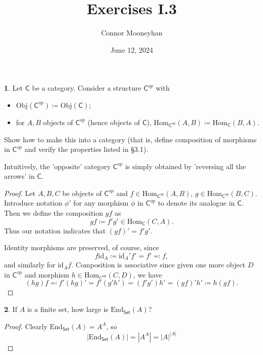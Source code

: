 \documentclass{article}
\title{Exercises I.3}
\author{Connor Mooneyhan}
\date{June 12, 2024}
\newcounter{section-number}
\theoremstyle{definition}
\newtheorem{ex}{}[section-number]
\begin{document}
\maketitle

\begin{ex}
	Let $\mathsf{C}$ be a category.
	Consider a structure $\mathsf{C}^{op}$ with \begin{itemize}
		\item $\mathrm{Obj}(\mathsf{C}^{op}) \coloneq \mathrm{Obj}(\mathsf{C})$;
		\item for $A, B$ objects of $\mathsf{C}^{op}$ (hence objects of $\mathsf{C}$), $\mathrm{Hom}_{\mathsf{C}^{op}}(A, B) \coloneq \mathrm{Hom}_{\mathsf{C}}(B, A)$.
	\end{itemize}
	Show how to make this into a category (that is, define composition of morphisms in $\mathsf{C}^{op}$ and verify the properties listed in \S 3.1).

	Intuitively, the 'opposite' category $\mathsf{C}^{op}$ is simply obtained by 'reversing all the arrows' in $\mathsf{C}$.
\end{ex}
\begin{proof}
	Let $A, B, C$ be objects of $\mathsf{C}^{op}$ and $f \in \mathrm{Hom}_{\mathsf{C}^{op}}(A, B)$, $g \in \mathrm{Hom}_{\mathsf{C}^{op}}(B, C)$.
	Introduce notation $\phi'$ for any morphism $\phi$ in $\mathsf{C}^{op}$ to denote its analogue in $\mathsf{C}$.
	Then we define the composition $gf$ as \begin{equation*}
		gf \coloneq f'g' \in \mathrm{Hom}_{\mathsf{C}}(C, A).
	\end{equation*}
	Thus our notation indicates that $(gf)' = f'g'$.

	Identity morphisms are preserved, of course, since \begin{equation*}
		f\mathrm{id}_A \coloneq \mathrm{id}_A'f' = f' \eqcolon f,
	\end{equation*}
	and similarly for $\mathrm{id}_A f$.
	Composition is associative since given one more object $D$ in $\mathsf{C}^{op}$ and morphism $h \in \mathrm{Hom}_{C^{op}}(C, D)$, we have \begin{equation*}
		(hg)f \eqcolon f'(hg)' = f'(g'h') = (f'g')h' = (gf)'h' \coloneq h(gf).
	\end{equation*}
\end{proof}

\begin{ex}
	If $A$ is a finite set, how large is $\mathrm{End}_{\mathsf{Set}}(A)$?
\end{ex}
\begin{proof}
	Clearly $\mathrm{End}_{\mathsf{Set}}(A) = A^A$, so \begin{equation*}
		|\mathrm{End}_{\mathsf{Set}}(A)| = |A^A| = |A|^{|A|}
	\end{equation*}
\end{proof}
\end{document}
